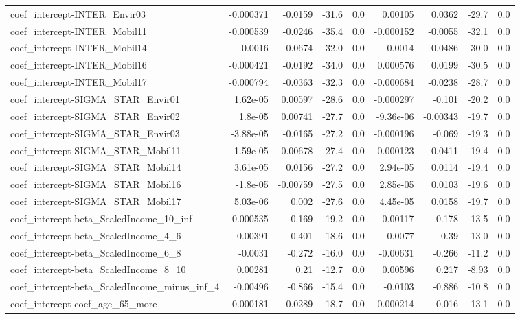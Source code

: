 \begin{tabular}{lrrrrrrrr}
coef_intercept-INTER_Envir03 & -0.000371 & -0.0159 & -31.6 & 0.0 & 0.00105 & 0.0362 & -29.7 & 0.0 \\
coef_intercept-INTER_Mobil11 & -0.000539 & -0.0246 & -35.4 & 0.0 & -0.000152 & -0.0055 & -32.1 & 0.0 \\
coef_intercept-INTER_Mobil14 & -0.0016 & -0.0674 & -32.0 & 0.0 & -0.0014 & -0.0486 & -30.0 & 0.0 \\
coef_intercept-INTER_Mobil16 & -0.000421 & -0.0192 & -34.0 & 0.0 & 0.000576 & 0.0199 & -30.5 & 0.0 \\
coef_intercept-INTER_Mobil17 & -0.000794 & -0.0363 & -32.3 & 0.0 & -0.000684 & -0.0238 & -28.7 & 0.0 \\
coef_intercept-SIGMA_STAR_Envir01 & 1.62e-05 & 0.00597 & -28.6 & 0.0 & -0.000297 & -0.101 & -20.2 & 0.0 \\
coef_intercept-SIGMA_STAR_Envir02 & 1.8e-05 & 0.00741 & -27.7 & 0.0 & -9.36e-06 & -0.00343 & -19.7 & 0.0 \\
coef_intercept-SIGMA_STAR_Envir03 & -3.88e-05 & -0.0165 & -27.2 & 0.0 & -0.000196 & -0.069 & -19.3 & 0.0 \\
coef_intercept-SIGMA_STAR_Mobil11 & -1.59e-05 & -0.00678 & -27.4 & 0.0 & -0.000123 & -0.0411 & -19.4 & 0.0 \\
coef_intercept-SIGMA_STAR_Mobil14 & 3.61e-05 & 0.0156 & -27.2 & 0.0 & 2.94e-05 & 0.0114 & -19.4 & 0.0 \\
coef_intercept-SIGMA_STAR_Mobil16 & -1.8e-05 & -0.00759 & -27.5 & 0.0 & 2.85e-05 & 0.0103 & -19.6 & 0.0 \\
coef_intercept-SIGMA_STAR_Mobil17 & 5.03e-06 & 0.002 & -27.6 & 0.0 & 4.45e-05 & 0.0158 & -19.7 & 0.0 \\
coef_intercept-beta_ScaledIncome_10_inf & -0.000535 & -0.169 & -19.2 & 0.0 & -0.00117 & -0.178 & -13.5 & 0.0 \\
coef_intercept-beta_ScaledIncome_4_6 & 0.00391 & 0.401 & -18.6 & 0.0 & 0.0077 & 0.39 & -13.0 & 0.0 \\
coef_intercept-beta_ScaledIncome_6_8 & -0.0031 & -0.272 & -16.0 & 0.0 & -0.00631 & -0.266 & -11.2 & 0.0 \\
coef_intercept-beta_ScaledIncome_8_10 & 0.00281 & 0.21 & -12.7 & 0.0 & 0.00596 & 0.217 & -8.93 & 0.0 \\
coef_intercept-beta_ScaledIncome_minus_inf_4 & -0.00496 & -0.866 & -15.4 & 0.0 & -0.0103 & -0.886 & -10.8 & 0.0 \\
coef_intercept-coef_age_65_more & -0.000181 & -0.0289 & -18.7 & 0.0 & -0.000214 & -0.016 & -13.1 & 0.0 \\

\end{tabular}
